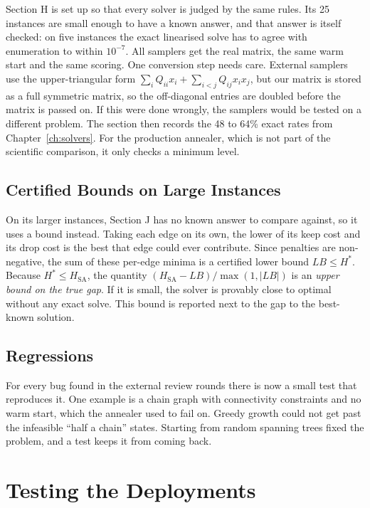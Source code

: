 Section H is set up so that every solver is judged by the same rules. Its 25
instances are small enough to have a known answer, and that answer is itself
checked: on five instances the exact linearised solve has to agree with
enumeration to within $10^{-7}$. All samplers get the real matrix, the same
warm start and the same scoring. One conversion step needs care. External
samplers use the upper-triangular form
$\sum_iQ_{ii}x_i+\sum_{i<j}Q_{ij}x_ix_j$, but our matrix is stored as a full
symmetric matrix, so the off-diagonal entries are doubled before the matrix is
passed on. If this were done wrongly, the samplers would be tested on a
different problem. The section then records the 48 to 64\% exact rates from
Chapter~\ref{ch:solvers}. For the production annealer, which is not part of
the scientific comparison, it only checks a minimum level.

\subsection{Certified Bounds on Large Instances}

On its larger instances, Section J has no known answer to compare against,
so it uses a bound instead. Taking each edge on its own, the lower of its keep
cost and its drop cost is the best that edge could ever contribute. Since
penalties are non-negative, the sum of these per-edge minima is a certified
lower bound $LB\le H^{*}$. Because $H^{*}\le H_{\mathrm{SA}}$, the quantity
$(H_{\mathrm{SA}}-LB)/\max(1,|LB|)$ is an \emph{upper bound on the true gap}.
If it is small, the solver is provably close to optimal without any exact
solve. This bound is reported next to the gap to the best-known solution.

\subsection{Regressions}

For every bug found in the external review rounds there is now a small test
that reproduces it. One example is a chain graph with connectivity constraints
and no warm start, which the annealer used to fail on. Greedy growth could not
get past the infeasible ``half a chain'' states. Starting from random spanning
trees fixed the problem, and a test keeps it from coming back.

\section{Testing the Deployments}

